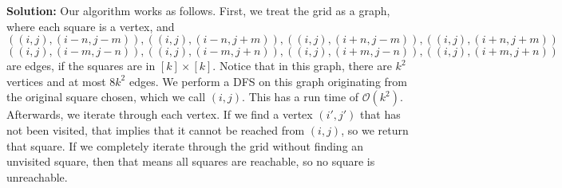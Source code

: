 \documentclass{assignment-263}
\begin{document}
 \textbf{Solution:} Our algorithm works as follows. First, we treat the grid as a graph, where each square is a vertex, and
 \[
  ((i,j), (i - n, j - m)),((i,j), (i - n, j + m)),((i,j), (i + n, j - m)),((i,j), (i + n, j + m))
 \]
 \[
  ((i,j), (i - m, j - n)),((i,j), (i - m, j + n)),((i,j), (i + m, j - n)),((i,j), (i + m, j + n))
 \]
 are edges, if the squares are in \([k]\times [k]\). Notice that in this graph, there are \(k^2\) vertices and at most \(8k^2\) edges. We perform a DFS on this graph originating from the original square chosen, which we call \((i,j)\). This has a run time of \(\mathcal{O} (k^2)\). Afterwards, we iterate through each vertex. If we find a vertex \((i', j')\) that has not been visited, that implies that it cannot be reached from \((i,j)\), so we return that square. If we completely iterate through the grid without finding an unvisited square, then that means all squares are reachable, so no square is unreachable.

\program
\end{document}
